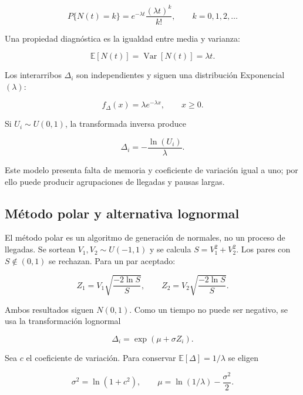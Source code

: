 \documentclass[12pt,a4paper]{article}
\begin{document}
\begin{equation}
P\{N(t)=k\}=e^{-\lambda t}\frac{(\lambda t)^k}{k!},
\qquad k=0,1,2,\ldots
\end{equation}

Una propiedad diagn\'ostica es la igualdad entre media y varianza:

\begin{equation}
\mathbb{E}[N(t)]=\operatorname{Var}[N(t)]=\lambda t.
\end{equation}

Los interarribos $\Delta_i$ son independientes y siguen una distribuci\'on
Exponencial$(\lambda)$:

\begin{equation}
f_{\Delta}(x)=\lambda e^{-\lambda x},\qquad x\geq 0.
\end{equation}

Si $U_i\sim U(0,1)$, la transformada inversa produce

\begin{equation}
\boxed{\Delta_i=-\frac{\ln(U_i)}{\lambda}}.
\end{equation}

Este modelo presenta falta de memoria y coeficiente de variaci\'on igual a uno;
por ello puede producir agrupaciones de llegadas y pausas largas.

\subsection{M\'etodo polar y alternativa lognormal}

El m\'etodo polar es un algoritmo de generaci\'on de normales, no un proceso de
llegadas. Se sortean $V_1,V_2\sim U(-1,1)$ y se calcula
$S=V_1^2+V_2^2$. Los pares con $S\notin(0,1)$ se rechazan. Para un par aceptado:

\begin{equation}
Z_1=V_1\sqrt{\frac{-2\ln S}{S}},\qquad
Z_2=V_2\sqrt{\frac{-2\ln S}{S}}.
\end{equation}

Ambos resultados siguen $N(0,1)$. Como un tiempo no puede ser negativo, se usa
la transformaci\'on lognormal

\begin{equation}
\Delta_i=\exp(\mu+\sigma Z_i).
\end{equation}

Sea $c$ el coeficiente de variaci\'on. Para conservar
$\mathbb{E}[\Delta]=1/\lambda$ se eligen

\begin{equation}
\sigma^2=\ln(1+c^2),\qquad
\mu=\ln(1/\lambda)-\frac{\sigma^2}{2}.
\end{equation}
\end{document}
